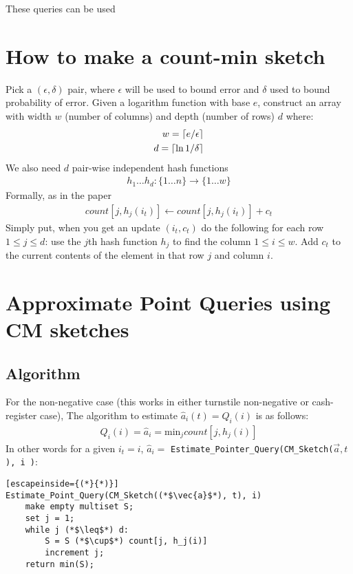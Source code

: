 \documentclass[11pt]{article}
\newcommand{\sq}{\mathit{Q}_i}
\DeclarePairedDelimiter\ceil{\lceil}{\rceil}
\newcommand{\ra}{\rightarrow}
\begin{document}
These queries can be used 

\section{How to make a count-min sketch}
Pick a $(\epsilon, \delta)$ pair, where $\epsilon$ will be used to bound error 
and $\delta$ used to bound probability of error.  Given a logarithm function
with base $e$, construct an array with width $w$ (number of columns) and 
depth (number of rows) $d$ where:
\begin{align}
    w = \ceil{e/\epsilon}\\
    d = \ceil{\ln{1/\delta}}
\end{align}
We also need $d$ pair-wise independent hash functions
\begin{align}
    h_1 \dots h_d : \{1 \dots n\} \ra \{1 \dots w\} 
\end{align}
Formally, as in the paper
\begin{align}
    count[j, h_j(i_t)] \leftarrow count[j, h_j(i_t)] + c_t     
\end{align}
Simply put, when you get an update $(i_t, c_t)$ do the following for each row $1 \leq j \leq d$:
use the $j$th hash function $h_j$ to find the column $1 \leq i \leq w$. Add $c_t$ to the current
contents of the element in that row $j$ and column $i$. 

\section{Approximate Point Queries using CM sketches}
\subsection{Algorithm}
For the non-negative case (this works in either turnstile non-negative or cash-register case),
The algorithm to estimate $\hat{a}_i(t) = \sq(i)$ is as follows: \begin{align}
    \sq(i) = \hat{a}_i = \text{min}_j count[j, h_j(i)]
\end{align}
In other words for a given $i_t = i$, $\hat a_i =$ \texttt{Estimate\_Pointer\_Query(CM\_Sketch($\vec{a}, t$), i )}:
\begin{lstlisting}[escapeinside={(*}{*)}]
Estimate_Point_Query(CM_Sketch((*$\vec{a}$*), t), i) 
    make empty multiset S;
    set j = 1;
    while j (*$\leq$*) d:
        S = S (*$\cup$*) count[j, h_j(i)]
        increment j;
    return min(S);
\end{lstlisting}
\end{document}
